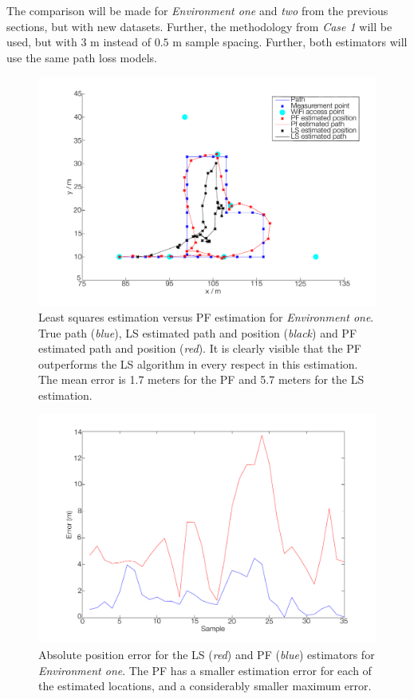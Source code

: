 \documentclass{LTHthesis}
\begin{document}
The comparison will be made for \emph{Environment one} and \emph{two} from the previous sections, but with new datasets. Further, the methodology from \emph{Case 1} will be used, but with 3 m instead of $0.5$ m sample spacing. Further, both estimators will use the same path loss models.   
%
\begin{figure}[!hbt]

\includegraphics[width=1\textwidth ]{images/pure_rssi/ls_short_path}
\caption{Least squares estimation versus PF estimation for \emph{Environment one}. True path (\emph{blue}), LS estimated path and position (\emph{black}) and PF estimated path and position (\emph{red}). It is clearly visible that the PF outperforms the LS algorithm in every respect in this estimation. The mean error is 1.7 meters for the PF and 5.7 meters for the LS estimation.}\label{ls_short}
\end{figure}
%
\begin{figure}[!hbt]

\includegraphics[width=1\textwidth ]{images/pure_rssi/ls_error_short}
\caption{Absolute position error for the LS (\emph{red}) and PF (\emph{blue}) estimators for \emph{Environment one}. The PF has a smaller estimation error for each of the estimated locations, and a considerably smaller maximum error.}\label{ls_error_short}
\end{figure}
\end{document}
